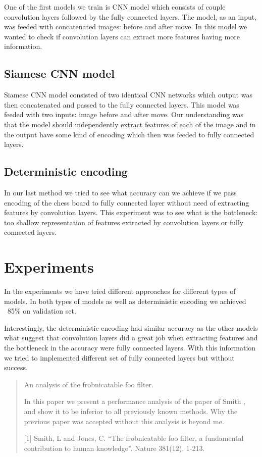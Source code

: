 \documentclass[10pt,twocolumn,letterpaper]{article}
\begin{document}
One of the first models we train is CNN model which consists of couple convolution
layers followed by the fully connected layers. The model, as an input, was feeded
with concatenated images: before and after move. In this model we wanted to check
if convolution layers can extract more features having more information.

\subsection{Siamese CNN model}

Siamese CNN model consisted of two identical CNN networks which output was then
concatenated and passed to the fully connected layers. This model was feeded
with two inputs: image before and after move. Our understanding was that the
model should independently extract features of each of the image and in the
output have some kind of encoding which then was feeded to fully connected
layers.

\subsection{Deterministic encoding}

In our last method we tried to see what accuracy can we achieve if we pass
encoding of the chess board to fully connected layer without need of extracting
features by convolution layers. This experiment was to see what is the bottleneck:
too shallow representation of features extracted by convolution layers or fully
connected layers.

\section{Experiments}

In the experiments we have tried different approaches for different types of
models. In both types of models as well as deterministic encoding we achieved
~85\% on validation set.

Interestingly, the deterministic encoding had similar accuracy as the other models
what suggest that convolution layers did a great job when extracting features
and the bottleneck in the accuracy were fully connected layers. With this information
we tried to implemented different set of fully connected layers but without
success.

\begin{quote}
\begin{center}
     An analysis of the frobnicatable foo filter.
\end{center}

   In this paper we present a performance analysis of the paper of Smith \etal
   [1], and show it to be inferior to all previously known methods.  Why the
   previous paper was accepted without this analysis is beyond me.

   [1] Smith, L and Jones, C. ``The frobnicatable foo filter, a fundamental
   contribution to human knowledge''. Nature 381(12), 1-213.
\end{quote}
\end{document}
